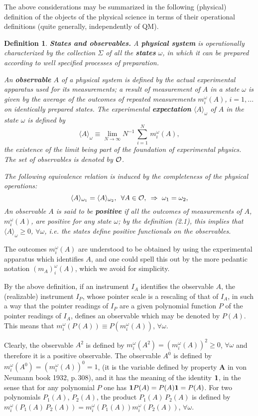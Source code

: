 \documentclass[12pt]{article}
\newtheorem{Definition}[Theorem]{Definition}
\def \lan   {\langle}
\def \ran   {\rangle}
\def \be {\begin{equation}}
\def \ee {\end{equation}}
\def \ra {\rightarrow}
\def \eqq {\equiv}
\def \om {{\omega}}
\def \O {{\cal O}}
\def \id {{\bf 1 }}
\begin{document}
The above considerations may be summarized in the following (phy\-sical) definition of the objects of the physical science  in terms of their operational definitions (quite generally, independently of QM).

\begin{Definition} {\bf States and observables.}   A {\bf physical system} is operationally characterized by the collection $\Sigma$ of all the {\bf states} $\om$, in which it can be prepared according to well specified processes of preparation.

An {\bf observable} $A$ of a physical system is defined by the actual experimental apparatus used for its measurements; a result of  measurement of $A$ in a  state $\om$ is given by the average of the outcomes of repeated measurements $m^\om_i(A)$, $i = 1, ...$ on identically prepared states. The  experimental {\bf expectation} $\lan A \ran_\om$ of $A$ in the state $\om$ is defined by  \be{\lan A \ran_\om \eqq \lim_{N \ra \infty} N^{-1} \,\sum_{i = 1}^N \,m^\om_i(A) ,}\ee the existence of the limit  being  part of  the foundation of experimental phys\-ics. 
The set of observables is denoted by $\O$.

The following equivalence relation is induced by the completeness of the physical operations: \be{ \lan A \ran_{\om_1} = \lan A \ran_{\om_2}, \,\,\,\forall A \in \O, \,\,\, \Rightarrow \,\,\om_1 = \om_2,}\ee  
An observable $A$ is said to be {\bf positive} if all the outcomes of measurements of $A$, $m^\om_i(A)$, are positive for any state $\om$; by the definition (2.1), this implies that  $\lan A \ran_\om \geq 0$, $\forall \om$, i.e. the states define positive functionals on the observables. 
 \end{Definition}

The outcomes $m_i^\omega(A)$ are understood to be obtained by using the experimental apparatus which identifies $A$, and one could spell this out by the more pedantic notation $(m_A)_i^\omega(A)$, which we avoid for simplicity. 

By the above definition,  if  
an instrument $I_A$ identifies the observable $A$,   the (realizable) instrument $I_P$, whose pointer scale is a rescaling of that of $I_A$, in such a way  that the pointer readings of $I_P$ are a given  polynomial function $P$ of the pointer readings of $I_A$,  defines an observable which may be denoted by $P(A)$. This means that $m^\om_i(P(A)) \eqq P(m^\om_i(A))$, $\forall \om$. 

Clearly, the observable $A^2$ is defined by $m^\om_i(A^2) = (m^\om_i(A))^2 \geq 0$, $\forall 
\om$ and therefore it is a positive observable. The observable $A^0$ is  defined  by $m^\om_i(A^0) = (m^\om_i(A))^0 = 1$, (it is the variable defined by property {\bf A} in von Neumann book 1932, p.\,308), and it has the meaning of the identity $\id$, in the sense that 
for any polynomial $P$ one has $\id P(A) = P(A) \id = P(A)$. 
For two polynomials $P_1(A)$, $P_2(A)$, the  product $P_1(A) \,P_2(A)$ is defined by $m^\om_i(P_1(A)\, P_2(A)) = m^\om_i(P_1(A)) m^\om_i(P_2(A))$, $\forall \om$.
\end{document}
